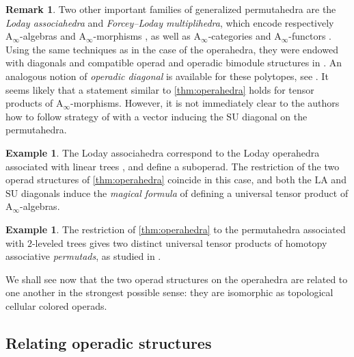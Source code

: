 \documentclass{amsart}
\theoremstyle{definition}
\newtheorem{example}[theorem]{Example}
\newtheorem{remark}[theorem]{Remark}
\newcommand{\SU}{\mathrm{SU}}
\newcommand{\LA}{\mathrm{LA}}
\newcommand{\Ainf}{\ensuremath{\mathrm{A}_\infty}}
\begin{document}
\begin{remark}
Two other important families of generalized permutahedra are the \emph{Loday associahedra} and \emph{Forcey--Loday multiplihedra}, which encode respectively $\Ainf$-algebras and $\Ainf$-morphisms \cite[Prop.~4.9]{LaplanteAnfossiMazuir}, as well as $\Ainf$-categories and $\Ainf$-functors \cite[Sect.~4.3]{LaplanteAnfossiMazuir}.
Using the same techniques as in the case of the operahedra, they were endowed with diagonals and compatible operad and operadic bimodule structures in \cite[Thm.~1]{LaplanteAnfossiMazuir}.
An analogous notion of \emph{operadic diagonal} is available for these polytopes, see \cite[Prop.~2.14]{LaplanteAnfossiMazuir}.
It seems likely that a statement similar to \cref{thm:operahedra} holds for tensor products of $\Ainf$-morphisms. 
However, it is not immediately clear to the authors how to follow strategy of \cite{LaplanteAnfossiMazuir} with a vector inducing the $\SU$ diagonal on the permutahedra.
\end{remark}

\begin{example}
	The Loday associahedra correspond to the Loday operahedra associated with linear trees \cite[Sec. 2.2]{LaplanteAnfossi}, and define a suboperad.
	The restriction of the two operad structures of \cref{thm:operahedra} coincide in this case, and both the $\LA$ and $\SU$ diagonals induce the \emph{magical formula} of \cite{MarklShnider, MasudaThomasTonksVallette, SaneblidzeUmble-comparingDiagonals} defining a universal tensor product of $\Ainf$-algebras. 
\end{example}

\begin{example}
	The restriction of \cref{thm:operahedra} to the permutahedra associated with $2$-leveled trees gives two distinct universal tensor products of homotopy associative \emph{permutads}, as studied in \cite{LodayRonco-permutads,Markl}.
\end{example}

We shall see now that the two operad structures on the operahedra are related to one another in the strongest possible sense: they are isomorphic as topological cellular colored operads.


\subsection{Relating operadic structures} 
\end{document}
